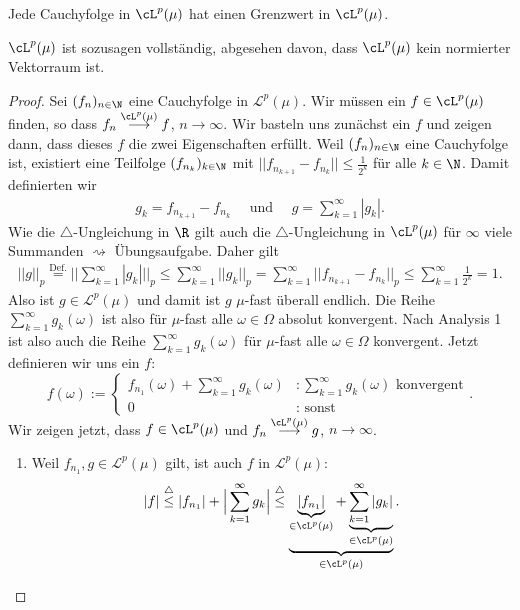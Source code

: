 \begin{satz}\label{lpcauchy}
	Jede Cauchyfolge in $\cL^p(\mu)$ hat einen Grenzwert in $\cL^p(\mu)$.
\end{satz}
$\cL^p(\mu)$ ist sozusagen vollständig, abgesehen davon, dass $\cL^p(\mu)$ kein normierter Vektorraum ist.
\begin{proof}
	Sei $(f_n)_{n\in\N}$ eine Cauchyfolge in $\mathcal L^p(\mu)$. Wir m\"ussen ein $f \in \cL^p(\mu)$ finden, so dass $f_n \overset{\cL^p(\mu)}{\longrightarrow} f$, $n \to \infty$. Wir basteln uns zun\"achst ein $f$ und zeigen dann, dass dieses $f$ die zwei Eigenschaften erf\"ullt. Weil $(f_n)_{n\in\N}$ eine Cauchyfolge ist, existiert eine Teilfolge $(f_{n_k})_{k\in \N}$ mit $|| f_{n_{k+1}} - f_{n_k} || \leq \frac{1}{2^k}$ f\"ur alle $k\in\N$. Damit definierten wir 
	\begin{align*}
	g_k = f_{n_{k+1}} - f_{n_k}\quad \text{ und }\quad g = \sum_{k=1}^{\infty} |g_k|.
	\end{align*}	
	Wie die $\triangle$-Ungleichung in $\R$ gilt auch die $\triangle$-Ungleichung in $\cL^p(\mu)$ für $\infty$ viele Summanden $\rightsquigarrow$ Übungsaufgabe. Daher gilt 
	\begin{gather*}
	||g||_p \overset{\text{Def.}}{=} \Big|\Big| \sum\limits_{k=1}^{\infty} |g_k| \Big|\Big|_p \leq \sum\limits_{k=1}^{\infty} ||g_k||_p=\sum\limits_{k=1}^{\infty} ||f_{n_{k+1}}-f_{n_k}||_p \leq \sum\limits_{k=1}^{\infty} \frac{1}{2^k} = 1.
	\end{gather*}
	Also ist $g\in \mathcal L^p(\mu)$ und damit ist $g$ $\mu$-fast überall endlich. Die Reihe $\sum_{k=1}^{\infty} g_k(\omega)$ ist also für $\mu$-fast alle $\omega \in \Omega$ absolut konvergent. Nach Analysis 1 ist also auch die Reihe $\sum_{k=1}^{\infty} g_k(\omega)$ f\"ur $\mu$-fast alle $\omega\in \Omega$ konvergent. Jetzt definieren wir uns ein $f$:
	\[ f(\omega) := \begin{cases}
	f_{n_1}(\omega) + \sum\limits_{k=1}^{\infty} g_k(\omega)&: \sum\limits_{k=1}^{\infty} g_k(\omega) \text{ konvergent}\\
	0&:\text{ sonst}
	\end{cases}. \]
	Wir zeigen jetzt, dass $f \in \cL^p(\mu)$ und $f_n \overset{\cL^p(\mu)}{\longrightarrow} g$, $n \to \infty$.
	\begin{enumerate}[label=(\roman*)]
		\item 
		Weil $f_{n_1}, g\in \mathcal L^p(\mu)$ gilt, ist auch $f$ in $\mathcal L^p(\mu)$:
		\[ |f| \overset{\triangle}{\leq} |f_{n_1}| + \Big| \sum\limits_{k=1}^{\infty} g_k \Big| \overset{\triangle}{\leq} \underbrace{\underbrace{|f_{n_1}|}_{\in \cL^p(\mu)} +  \underbrace{\sum\limits_{k=1}^{\infty} | g_k |}_{\in \cL^p(\mu)}}_{\in \cL^p(\mu)}.
\]
\end{enumerate}
\end{proof}
